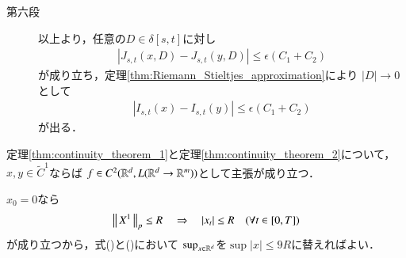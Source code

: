 \begin{prf}
\begin{description}
			\item[第六段]
				以上より，任意の$D \in \delta[s,t]$に対し
				\begin{align}
					\left| J_{s,t}(x,D) - J_{s,t}(y,D) \right|
					\leq \epsilon (C_1 + C_2)
				\end{align}
				が成り立ち，定理\ref{thm:Riemann_Stieltjes_approximation}により
				$|D| \longrightarrow 0$として
				\begin{align}
					\left| I_{s,t}(x) - I_{s,t}(y) \right|
					\leq \epsilon (C_1 + C_2)
				\end{align}
				が出る．
				\QED
		\end{description}
	\end{prf}
	
	\begin{screen}
		\begin{cor}
			定理\ref{thm:continuity_theorem_1}と定理\ref{thm:continuity_theorem_2}について，
			$x,y \in \tilde{C}^1$ならば
			$f \in C^2(\mathbb{R}^d,L(\mathbb{R}^d \rightarrow \mathbb{R}^m))$として主張が成り立つ．
		\end{cor}
	\end{screen}
	
	\begin{prf}
		$x_0 = 0$なら
		\begin{align}
			\left\|\, X^1\, \right\|_{p} \leq R \quad \Rightarrow \quad |x_t| \leq R \quad (\forall t \in [0,T])
		\end{align}
		が成り立つから，式()と()において
		$\operatorname*{sup}_{x\in\mathbb{R}^d} $を$\sup{|x| \leq 9R}$に替えればよい．
		\QED
	\end{prf}